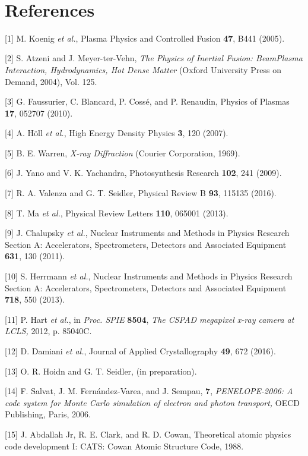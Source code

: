 \emph{\\}

\section{References}

{[}1{]} M. Koenig \emph{et al.}, Plasma Physics and Controlled Fusion
\textbf{47}, B441 (2005).

{[}2{]} S. Atzeni and J. Meyer-ter-Vehn, \emph{The Physics of Inertial
Fusion: BeamPlasma Interaction, Hydrodynamics, Hot Dense Matter} (Oxford
University Press on Demand, 2004), Vol. 125.

{[}3{]} G. Faussurier, C. Blancard, P. Cossé, and P. Renaudin, Physics
of Plasmas \textbf{17}, 052707 (2010).

{[}4{]} A. Höll \emph{et al.}, High Energy Density Physics \textbf{3},
120 (2007).

{[}5{]} B. E. Warren, \emph{X-ray Diffraction} (Courier Corporation,
1969).

{[}6{]} J. Yano and V. K. Yachandra, Photosynthesis Research
\textbf{102}, 241 (2009).

{[}7{]} R. A. Valenza and G. T. Seidler, Physical Review B \textbf{93},
115135 (2016).

{[}8{]} T. Ma \emph{et al.}, Physical Review Letters \textbf{110},
065001 (2013).

{[}9{]} J. Chalupsky \emph{et al.}, Nuclear Instruments and Methods in
Physics Research Section A: Accelerators, Spectrometers, Detectors and
Associated Equipment \textbf{631}, 130 (2011).

{[}10{]} S. Herrmann \emph{et al.}, Nuclear Instruments and Methods in
Physics Research Section A: Accelerators, Spectrometers, Detectors and
Associated Equipment \textbf{718}, 550 (2013).

{[}11{]} P. Hart \emph{et al.}, in \emph{Proc. SPIE} \textbf{8504},
\emph{The CSPAD megapixel x-ray camera at LCLS,} 2012, p. 85040C.

{[}12{]} D. Damiani \emph{et al.}, Journal of Applied Crystallography
\textbf{49}, 672 (2016).

{[}13{]} O. R. Hoidn and G. T. Seidler, (in preparation).

{[}14{]} F. Salvat, J. M. Fernández-Varea, and J. Sempau, \textbf{7},
\emph{PENELOPE-2006: A code system for Monte Carlo simulation of
electron and photon transport,} OECD Publishing, Paris, 2006.

{[}15{]} J. Abdallah Jr, R. E. Clark, and R. D. Cowan, Theoretical
atomic physics code development I: CATS: Cowan Atomic Structure Code,
1988.

